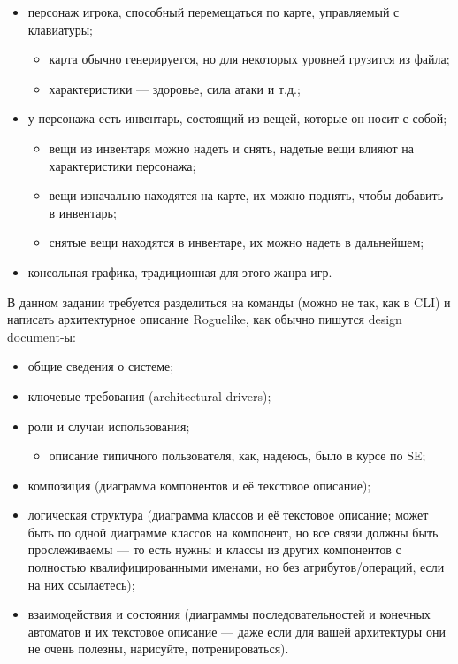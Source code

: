 \documentclass[a5paper]{homework}
\begin{document}
\begin{itemize}
    \item персонаж игрока, способный перемещаться по карте, управляемый с клавиатуры;
    \begin{itemize}
        \item карта обычно генерируется, но для некоторых уровней грузится из файла;
        \item характеристики --- здоровье, сила атаки и т.д.;
    \end{itemize}
    \item у персонажа есть инвентарь, состоящий из вещей, которые он носит с собой;
    \begin{itemize}
        \item вещи из инвентаря можно надеть и снять, надетые вещи влияют на характеристики персонажа;
        \item вещи изначально находятся на карте, их можно поднять, чтобы добавить в инвентарь;
        \item снятые вещи находятся в инвентаре, их можно надеть в дальнейшем;
    \end{itemize}
    \item консольная графика, традиционная для этого жанра игр.
\end{itemize}

В данном задании требуется разделиться на команды (можно не так, как в CLI) и написать архитектурное описание Roguelike, как обычно пишутся design document-ы:

\begin{itemize}
    \item общие сведения о системе;
    \item ключевые требования (architectural drivers);
    \item роли и случаи использования;
    \begin{itemize}
        \item описание типичного пользователя, как, надеюсь, было в курсе по SE;
    \end{itemize}
    \item композиция (диаграмма компонентов и её текстовое описание);
    \item логическая структура (диаграмма классов и её текстовое описание; может быть по одной диаграмме классов на компонент, но все связи должны быть прослеживаемы --- то есть нужны и классы из других компонентов с полностью квалифицированными именами, но без атрибутов/операций, если на них ссылаетесь);
    \item взаимодействия и состояния (диаграммы последовательностей и конечных автоматов и их текстовое описание --- даже если для вашей архитектуры они не очень полезны, нарисуйте, потренироваться).
\end{itemize}
\end{document}
